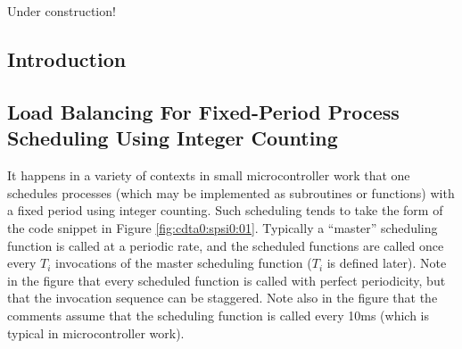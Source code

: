 
\chapter[\cdtazeroshorttitle{}]{\cdtazerolongtitle{}}

\label{cdta0}

                     {Under construction!}


\section{Introduction}
\label{cdta0:sint0}


\section[Fixed-Period Process Scheduling]
        {Load Balancing For Fixed-Period Process Scheduling Using Integer Counting}
\label{cdta0:spsi0}

It happens in a variety of 
contexts in small microcontroller work
that one schedules processes (which may be implemented as subroutines
or functions) with a fixed period
using integer counting.  Such scheduling tends to take the form of
the code snippet in  
Figure \ref{fig:cdta0:spsi0:01}.  Typically a ``master'' scheduling function
is called at a periodic rate, and the scheduled functions are called
once every $T_i$ invocations of the master scheduling function ($T_i$ is
defined later).  Note in the figure that every scheduled function
is called with perfect periodicity, but that the invocation sequence
can be staggered.  Note also in the figure that the comments assume
that the scheduling function is called every 10ms (which is typical in
microcontroller work). 

